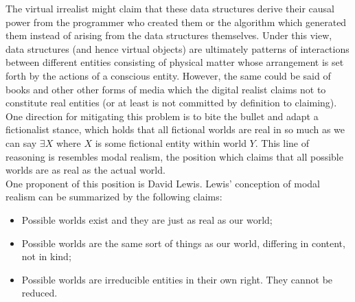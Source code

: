  The virtual irrealist might claim that these data structures derive their causal power from the programmer who created them or the algorithm which generated them instead of arising from the data structures themselves. Under this view, data structures (and hence virtual objects) are ultimately patterns of interactions between different entities consisting of physical matter whose arrangement is set forth by the actions of a conscious entity. However, the same could be said of books and other other forms of media which the digital realist claims not to constitute real entities (or at least is not committed by definition to claiming). One direction for mitigating this problem is to bite the bullet and adapt a fictionalist stance, which holds that all fictional worlds are real in so much as we can say $\exists X$ where $X$ is some fictional entity within world $Y$. This line of reasoning is resembles modal realism, the position which claims that all possible worlds are as real as the actual world.\cite{lewis1986on} 
 \\
 
 
 One proponent of this position is David Lewis. Lewis' conception of modal realism can be summarized by the following claims:
 \begin{itemize}
 	\item Possible worlds exist and they are just as real as our world;
 	
 	\item Possible worlds are the same sort of things as our world,  differing in content, not in kind;
 	\item Possible worlds are irreducible entities in their own right. They cannot be reduced.  \cite{lewis2001counterfactuals} 
 \end{itemize}

